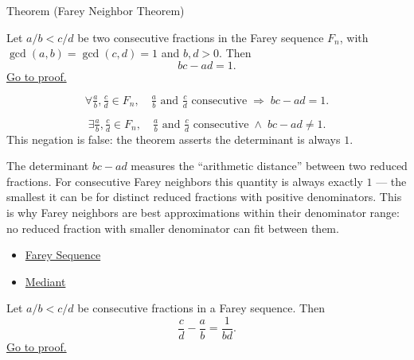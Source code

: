 \begin{theorembox}{Theorem (Farey Neighbor Theorem)}
\begin{theorem}
\label{thm:farey-neighbor-theorem}
Let $a/b < c/d$ be two consecutive fractions in the Farey sequence $F_n$,
with $\gcd(a,b) = \gcd(c,d) = 1$ and $b,d > 0$.  Then
\[
bc - ad = 1.
\]
\hyperref[prf:farey-neighbor-theorem]{Go to proof.}
\end{theorem}
\end{theorembox}

\begin{remark*}
\[
\forall \tfrac{a}{b}, \tfrac{c}{d} \in F_n,\quad
\tfrac{a}{b} \text{ and } \tfrac{c}{d} \text{ consecutive}
\;\Longrightarrow\;
bc - ad = 1.
\]
\end{remark*}

\begin{remark*}
\[
\exists \tfrac{a}{b}, \tfrac{c}{d} \in F_n,\quad
\tfrac{a}{b} \text{ and } \tfrac{c}{d} \text{ consecutive}
\;\land\; bc - ad \neq 1.
\]
This negation is false: the theorem asserts the determinant is always $1$.
\end{remark*}

\begin{remark*}[Interpretation]
The determinant $bc - ad$ measures the ``arithmetic distance'' between two
reduced fractions.  For consecutive Farey neighbors this quantity is always
exactly $1$ — the smallest it can be for distinct reduced fractions with
positive denominators.  This is why Farey neighbors are best approximations
within their denominator range: no reduced fraction with smaller denominator
can fit between them.
\end{remark*}

\begin{remark*}[Dependencies]
\begin{itemize}
  \item \hyperref[def:farey-sequence]{Farey Sequence}
  \item \hyperref[def:mediant]{Mediant}
\end{itemize}
\end{remark*}

\begin{theorem}
\label{thm:farey-gap}
Let $a/b < c/d$ be consecutive fractions in a Farey sequence.  Then
\[
\frac{c}{d} - \frac{a}{b} = \frac{1}{bd}.
\]
\hyperref[prf:farey-gap]{Go to proof.}
\end{theorem}

